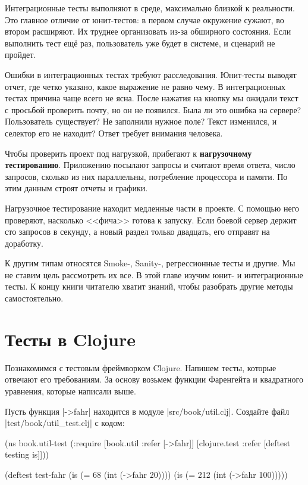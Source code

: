Интеграционные тесты выполняют в среде, максимально близкой к реальности. Это
главное отличие от юнит-тестов: в первом случае окружение сужают, во втором
расширяют. Их труднее организовать из-за обширного состояния. Если выполнить
тест ещ\"{е} раз, пользователь уже будет в системе, и сценарий не пройдет.

Ошибки в интеграционных тестах требуют расследования. Юнит-тесты выводят отчет,
где четко указано, какое выражение не равно чему. В интеграционных тестах
причина чаще всего не ясна. После нажатия на кнопку мы ожидали текст с просьбой
проверить почту, но он не появился. Была ли это ошибка на сервере? Пользователь
существует? Не заполнили нужное поле? Текст изменился, и селектор его не
находит? Ответ требует внимания человека.

Чтобы проверить проект под нагрузкой, прибегают к \textbf{нагрузочному тестированию}.
Приложению посылают запросы и считают время ответа, число запросов, сколько
из них параллельны, потребление процессора и памяти. По этим данным строят
отчеты и графики.

Нагрузочное тестирование находит медленные части в проекте. С помощью него
проверяют, насколько <<фича>> готова к запуску. Если боевой сервер держит сто
запросов в секунду, а новый раздел только двадцать, его отправят на доработку.

К другим типам относятся Smoke-, Sanity-, регрессионные тесты и другие. Мы не
ставим цель рассмотреть их все. В этой главе изучим юнит- и интеграционные
тесты. К концу книги читателю хватит знаний, чтобы разобрать другие методы
самостоятельно.

\section{Тесты в Clojure}

Познакомимся с тестовым фреймворком Clojure. Напишем тесты, которые отвечают его
требованиям. За основу возьмем функции Фаренгейта и квадратного уравнения,
которые написали выше.

Пусть функция \spverb|->fahr| находится в модуле \spverb|src/book/util.clj|.
Создайте файл \spverb|test/book/util_test.clj| с кодом:

\begin{english}
  \begin{clojure}
(ns book.util-test
  (:require [book.util :refer [->fahr]]
            [clojure.test :refer [deftest testing is]]))

(deftest test-fahr
  (is (= 68 (int (->fahr 20))))
  (is (= 212 (int (->fahr 100)))))
  \end{clojure}
\end{english}

